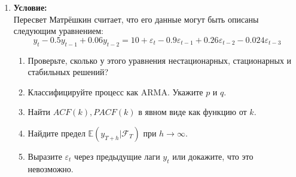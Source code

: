 \documentclass{article}
\begin{document}
\begin{enumerate}
\begin{enumerate}[label=(\arabic*)]
    \item При $p>0$ необходимо $q=\frac{1}{2}$, оценим дисперсию и ковариацию. \\
    $\mathbb{V}ar X_t = \mathbb{E}X_t^2 - (\mathbb{E}X_t)^2 = \mathbb{E}A_t^2(-1)^{2S_t} = \mathbb{E}A_t^2 = 0\cdot(1 - p) + 1\cdot p = p$ \\
    $cov(X_t, X_s) = \{\text{t>s}\} = \mathbb{E}(X_t - \mathbb{E}X_t)(X_s - \mathbb{E}X_s) = \mathbb{E}X_tX_s = \mathbb{E}A_tA_s\cdot(-1)^{S_t + S_s}=
    \mathbb{E}A_t\cdot\mathbb{E}A_s\cdot\mathbb{E}(-1)^{\sum\limits_{i=1}^{t-1} B_i + \sum\limits_{j=1}^{s-1} B_j}=
    p^2\cdot\mathbb{E}(-1)^{2\sum\limits_{i=1}^{s-1} B_i + \sum\limits_{j=s}^{t-1} B_j} = p^2\mathbb{E}(-1)^{\sum\limits_{j=s}^{t-1} B_j} =
    p^2\cdot\prod\limits_{j=s}^{t-1}\mathbb{E}(-1)^{B_j} = p^2\cdot(1-2q)^{t-s} = 0$ при $q=\frac{1}{2}, t>s$.\\
    Значит, $p\in(0, 1], q=\frac{1}{2}$ удовлетворяет условиям белого шума.
\end{enumerate}

\textbf{Замечание:} с учётом дословного следования текущему условию вариант $p>0$ не может быть решением, так как $X_1 = A_1\cdot(-1)^{\sum\limits_{k=1}^{0} B_k} = A_1\cdot(-1)^0 = A_1$, откуда
$\mathbb{E}A_1 = p > 0$; однако это небольшая некорректность и правильнее полагать $S_t = \sum\limits_{k=1}^{t} B_k$. \\

\item \textbf{Условие:} \\

Пересвет Матрёшкин считает, что его данные могут быть описаны следующим уравнением:
$$y_t - 0.5y_{t-1} + 0.06y_{t-2} = 10 + \varepsilon_t - 0.9\varepsilon_{t-1} + 0.26\varepsilon_{t-2} - 0.024\varepsilon_{t-3}$$
\begin{enumerate}
    \item Проверьте, сколько у этого уравнения нестационарных, стационарных и стабильных решений?
    \item Классифицируйте процесс как ARMA. Укажите $p$ и $q$.
    \item Найти $ACF(k), PACF(k)$ в явном виде как функцию от $k$.
    \item Найдите предел $\mathbb{E}(y_{T+h}|\mathcal{F}_T)$ при $h\rightarrow\infty$.
    \item Выразите $\varepsilon_t$ через предыдущие лаги $y_t$ или докажите, что это невозможно.
\end{enumerate}


\end{enumerate}
\end{document}
